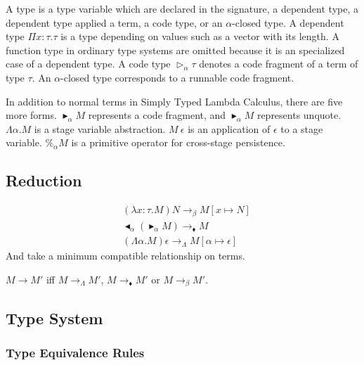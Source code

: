 \documentclass[runningheads]{llncs}
\newcommand{\TW}{\triangleright}
\newcommand{\TB}{\blacktriangleright}
\newcommand{\TBL}{\blacktriangleleft}
\begin{document}
A type is a type variable which are declared in the signature, a dependent type, a dependent type applied a term, a code type, or an $\alpha$-closed type.
A dependent type $\Pi x:\tau.\tau$ is a type depending on values such as a vector with its length.
A function type in ordinary type systems are omitted because it is an specialized case of a dependent type.
A code type $\TW_\alpha \tau$ denotes a code fragment of a term of type $\tau$.
An $\alpha$-closed type corresponds to a runnable code fragment.

In addition to normal terms in Simply Typed Lambda Calculus, there are five more forms.
$\TB_\alpha M$ represents a code fragment, and $\TB_\alpha M$ represents unquote.
$\Lambda\alpha.M$ is a stage variable abstraction.
$M\ \epsilon$ is an application of $\epsilon$ to a stage variable.
$\%_\alpha M$ is a primitive operator for cross-stage persistence.

\subsection{Reduction}

\begin{definition}[Reduction]
\begin{align*}
    & (\lambda x:\tau.M) N \longrightarrow_\beta M[x \mapsto N] \\
    & \TBL_\alpha (\TB_\alpha M)\longrightarrow_\blacklozenge M \\
    & (\Lambda \alpha.M) \epsilon \longrightarrow_\Lambda M[\alpha \mapsto \epsilon]
\end{align*}
And take a minimum compatible relationship on terms.

    $ M \longrightarrow M'$ iff 
    $ M \longrightarrow_\Lambda M' $, $ M \longrightarrow_\blacklozenge M' $ or $ M \longrightarrow_\beta M' $.
\end{definition}

\subsection{Type System}
\subsubsection{Type Equivalence Rules}
\end{document}
